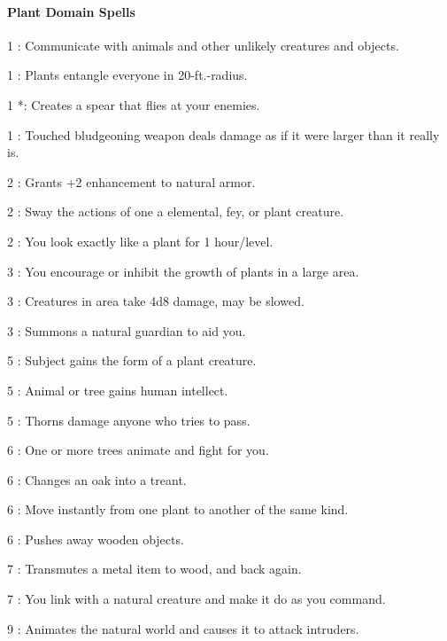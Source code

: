 \paragraph{Plant Domain Spells}
\begin{list}{}{\leftmargin=1em}
\item[1] : Communicate with animals and other unlikely creatures and objects.
\item[1] : Plants entangle everyone in 20-ft.-radius.
\item[1] *: Creates a spear that flies at your enemies.
\item[1] : Touched bludgeoning weapon deals damage as if it were larger than it really is.
\item[2] : Grants +2 enhancement to natural armor.
\item[2] : Sway the actions of one a elemental, fey, or plant creature.
\item[2] : You look exactly like a plant for 1 hour/level.
\item[3] : You encourage or inhibit the growth of plants in a large area.
\item[3] : Creatures in area take 4d8 damage, may be slowed.
\item[3] : Summons a natural guardian to aid you.
\item[5] : Subject gains the form of a plant creature.
\item[5] : Animal or tree gains human intellect.
\item[5] : Thorns damage anyone who tries to pass.
\item[6] : One or more trees animate and fight for you.
\item[6] : Changes an oak into a treant.
\item[6] : Move instantly from one plant to another of the same kind.
\item[6] : Pushes away wooden objects.
\item[7] : Transmutes a metal item to wood, and back again.
\item[7] : You link with a natural creature and make it do as you command.
\item[9] : Animates the natural world and causes it to attack intruders.
\end{list}
